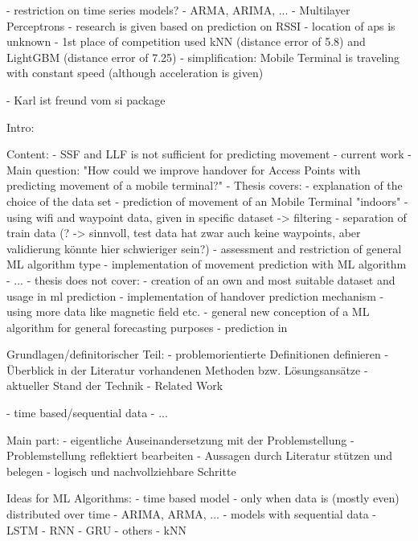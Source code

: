 


- restriction on time series models?
    - ARMA, ARIMA, ...
    - Multilayer Perceptrons
    - research is given based on prediction on RSSI 
    - location of aps is unknown
- 1st place of competition used kNN (distance error of 5.8) and LightGBM (distance error of 7.25)
- simplification: Mobile Terminal is traveling with constant speed (although acceleration is given)

- Karl ist freund vom si package

Intro:

    Content:
        - SSF and LLF is not sufficient for predicting movement
        - current work
        - Main question: "How could we improve handover for Access Points with predicting movement of a mobile terminal?"
        - Thesis covers:
            - explanation of the choice of the data set
            - prediction of movement of an Mobile Terminal "indoors"
                - using wifi and waypoint data, given in specific dataset -> filtering
                - separation of train data (? -> sinnvoll, test data hat zwar auch keine waypoints, aber validierung könnte hier schwieriger sein?)
            - assessment and restriction of general ML algorithm type
            - implementation of movement prediction with ML algorithm
            - ...
        - thesis does not cover:
            - creation of an own and most suitable dataset and usage in ml prediction
            - implementation of handover prediction mechanism
            - using more data like magnetic field etc.
            - general new conception of a ML algorithm for general forecasting purposes
            - prediction in

Grundlagen/definitorischer Teil:
    - problemorientierte Definitionen definieren
    - Überblick in der Literatur vorhandenen Methoden bzw. Lösungsansätze
    - aktueller Stand der Technik
    - Related Work

- time based/sequential data
- ...

Main part:
    - eigentliche Auseinandersetzung mit der Problemstellung
        - Problemstellung reflektiert bearbeiten
        - Aussagen durch Literatur stützen und belegen
        - logisch und nachvollziehbare Schritte

    Ideas for ML Algorithms:
        - time based model
            - only when data is (mostly even) distributed over time
            - ARIMA, ARMA, ...
        - models with sequential data
            - LSTM
            - RNN
            - GRU
        - others
            - kNN

